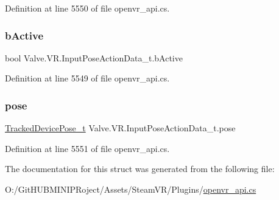 Definition at line 5550 of file openvr\+\_\+api.\+cs.

\mbox{\label{struct_valve_1_1_v_r_1_1_input_pose_action_data__t_a77309f1d87343c309533c9a73ccb06ba}} 
\subsubsection{\texorpdfstring{bActive}{bActive}}
{\footnotesize\ttfamily bool Valve.\+V\+R.\+Input\+Pose\+Action\+Data\+\_\+t.\+b\+Active}



Definition at line 5549 of file openvr\+\_\+api.\+cs.

\mbox{\label{struct_valve_1_1_v_r_1_1_input_pose_action_data__t_a33ada94bf8bfabf5b91c6b14d65d285c}} 
\subsubsection{\texorpdfstring{pose}{pose}}
{\footnotesize\ttfamily \mbox{\hyperlink{struct_valve_1_1_v_r_1_1_tracked_device_pose__t}{Tracked\+Device\+Pose\+\_\+t}} Valve.\+V\+R.\+Input\+Pose\+Action\+Data\+\_\+t.\+pose}



Definition at line 5551 of file openvr\+\_\+api.\+cs.



The documentation for this struct was generated from the following file\+:\begin{DoxyCompactItemize}
\item 
O\+:/\+Git\+H\+U\+B\+M\+I\+N\+I\+P\+Roject/\+Assets/\+Steam\+V\+R/\+Plugins/\mbox{\hyperlink{openvr__api_8cs}{openvr\+\_\+api.\+cs}}\end{DoxyCompactItemize}
